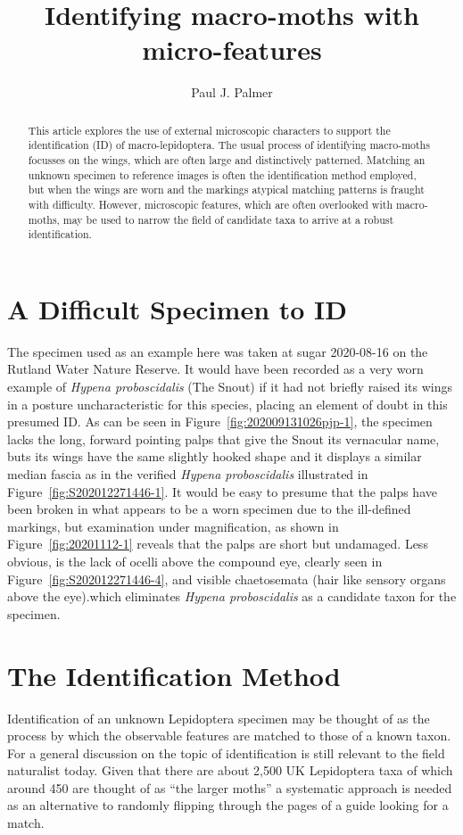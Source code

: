 \documentclass[]{article}
\title{Identifying macro-moths with micro-features}
\author{Paul J. Palmer}
\begin{document}
\maketitle

\begin{abstract}

This article explores the use of external microscopic characters to support the identification (ID) of  macro-lepidoptera. The usual process of identifying macro-moths  focusses on the wings, which are often large and distinctively patterned. Matching an unknown specimen to reference images is often the identification method employed, but when the wings are worn and the markings atypical matching patterns is fraught with difficulty.
 However, microscopic features, which are often overlooked with macro-moths, may be used to narrow the field of candidate taxa to arrive at a robust identification. 

\end{abstract}

\section*{A Difficult Specimen to ID}
The specimen used as an example here was taken at sugar 2020-08-16 on the Rutland Water Nature Reserve. It would have been recorded as a very worn example of \textit{Hypena proboscidalis} (The Snout) if it had not briefly raised its wings in a posture uncharacteristic for this species, placing an element of doubt in this presumed ID. As can be seen in Figure~\ref{fig:202009131026pjp-1}, the specimen lacks the long, forward pointing palps that give the Snout its vernacular name, buts its wings have the same slightly hooked shape  and it displays a similar median fascia as in the verified \textit{Hypena proboscidalis} illustrated in  Figure~\ref{fig:S202012271446-1}.  It would be easy to presume that the palps have been broken in what appears to be a worn specimen due to the ill-defined markings, but examination under magnification, as shown in  Figure~\ref{fig:20201112-1} reveals that the palps are short but undamaged. Less obvious,  is the lack of ocelli above the compound eye, clearly seen in Figure~\ref{fig:S202012271446-4}, and visible chaetosemata (hair like sensory organs above the eye).which  eliminates \textit{Hypena proboscidalis} as a candidate taxon for the specimen.

\section*{The Identification Method}
Identification of an unknown Lepidoptera specimen may be thought of as the process by which the  observable features are matched to those of a known taxon.
For a general discussion on the topic of identification \citet{Pankhurst1978} is still relevant to the field naturalist today.
 Given that there are about 2,500 UK Lepidoptera taxa of which around 450 are thought of as \enquote{the larger moths} a systematic approach is needed as an alternative to randomly flipping through the pages of a guide looking for a match.
 
\end{document}

